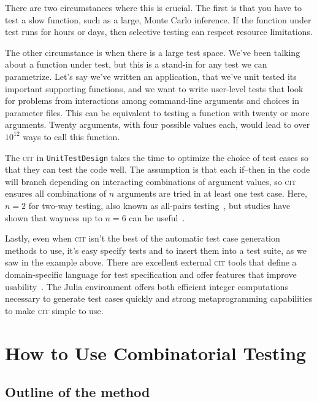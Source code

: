\documentclass{juliacon}
\newcommand{\utd}{\texttt{UnitTestDesign}\xspace}
\newcommand{\cit}{\textsc{cit}\xspace}
\begin{document}
\vskip 6pt
There are two circumstances where this is crucial. The first is that you have to test a slow function, such as a large, Monte Carlo inference. If the function under test runs for hours or days, then selective testing can respect resource limitations.

\vskip 6pt
The other circumstance is when there is a large test space. We've been talking about a function under test, but this is a stand-in for any test we can parametrize. Let's say we've written an application, that we've unit tested its important supporting functions, and we want to write user-level tests that look for problems from interactions among command-line arguments and choices in parameter files. This can be equivalent to testing a function with twenty or more arguments. Twenty arguments, with four possible values each, would lead to over $10^{12}$ ways to call this function.

\vskip 6pt
The \cit in \utd takes the time to optimize the choice of test cases so that they can test the code well. The assumption is that each if--then in the code will branch depending on interacting combinations of argument values, so \cit ensures all combinations of $n$ arguments are tried in at least one test case. Here, $n=2$ for two-way testing, also known as all-pairs testing~\cite{pairwise-website}, but studies have shown that wayness up to $n=6$ can be useful~\cite{Petke2015-ex}.

\vskip 6pt
Lastly, even when \cit isn't the best of the automatic test case generation methods to use, it's easy specify tests and to insert them into a test suite, as we saw in the example above. There are excellent external \cit tools that define a domain-specific language for test specification and offer features that improve usability~\cite{Czerwonka2006-hm,Kuhn2010-ak}. The Julia environment offers both efficient integer computations necessary to generate test cases quickly and strong metaprogramming capabilities to make \cit simple to use.

\section{How to Use Combinatorial Testing}\label{sec:how-to-use}

\subsection{Outline of the method}
\end{document}
